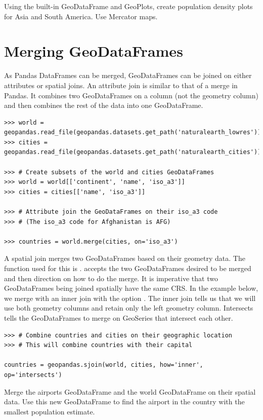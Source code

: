\begin{problem}
Using the built-in GeoDataFrame  and GeoPlots, create population density plots for Asia and South America.
Use Mercator maps.
\end{problem}

\section*{Merging GeoDataFrames}

As Pandas DataFrames can be merged, GeoDataFrames can be joined on either attributes or spatial joins.
An attribute join is similar to that of a merge in Pandas.
It combines two GeoDataFrames on a column (not the geometry column) and then combines the rest of the data into one GeoDataFrame.

\begin{lstlisting}
>>> world = geopandas.read_file(geopandas.datasets.get_path('naturalearth_lowres'))
>>> cities = geopandas.read_file(geopandas.datasets.get_path('naturalearth_cities'))

>>> # Create subsets of the world and cities GeoDataFrames
>>> world = world[['continent', 'name', 'iso_a3']]
>>> cities = cities[['name', 'iso_a3']]

>>> # Attribute join the GeoDataFrames on their iso_a3 code
>>> # (The iso_a3 code for Afghanistan is AFG)

>>> countries = world.merge(cities, on='iso_a3')
\end{lstlisting}

A spatial join merges two GeoDataFrames based on their geometry data.
The function used for this is .
 accepts the two GeoDataFrames desired to be merged and then direction on how to do the merge.
It is imperative that two GeoDataFrames being joined spatially have the same CRS.
In the example below, we merge with an inner join with the option .
The inner join tells us that we will use both geometry columns and retain only the left geometry column.
Intersects tells the GeoDataFrames to merge on GeoSeries that intersect each other.

\begin{lstlisting}
>>> # Combine countries and cities on their geographic location
>>> # This will combine countries with their capital

countries = geopandas.sjoin(world, cities, how='inner', op='intersects')
\end{lstlisting}

\begin{problem}
Merge the airports GeoDataFrame and the world GeoDataFrame on their spatial data.
Use this new GeoDataFrame to find the airport in the country with the smallest population estimate.
\end{problem}

